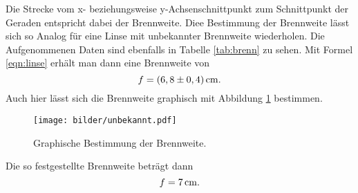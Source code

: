 Die Strecke vom x- beziehungsweise y-Achsenschnittpunkt zum Schnittpunkt der Geraden
entspricht dabei der Brennweite.
Diee Bestimmung der Brennweite lässt sich so Analog für eine Linse mit unbekannter
Brennweite wiederholen. Die Aufgenommenen Daten sind ebenfalls in Tabelle \ref{tab:brenn}
zu sehen. Mit Formel \eqref{eqn:linse} erhält man dann eine Brennweite von
\begin{equation*}
  f= (6,8 \pm 0,4) \,\si{\centi\meter}.
\end{equation*}
Auch hier lässt sich die Brennweite graphisch mit Abbildung \ref{fig:unb}
bestimmen.
\begin{figure}
  \centering
  \texttt{[image: bilder/unbekannt.pdf]}
  \caption{Graphische Bestimmung der Brennweite.}
  \label{fig:unb}
\end{figure}
Die so festgestellte Brennweite beträgt dann
\begin{equation*}
  f = 7\,\si{\centi\meter}.
\end{equation*}
